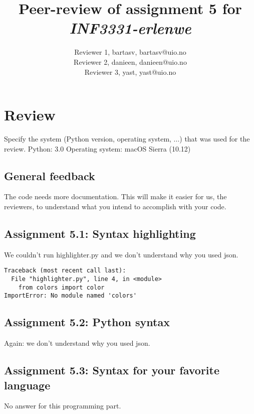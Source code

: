 \documentclass[a4paper]{article}
\title{Peer-review of assignment 5 for \textit{INF3331-erlenwe}}
\author{Reviewer 1, bartasv, {bartasv@uio.no} \\
 		Reviewer 2, danieen, {danieen@uio.no} \\
		Reviewer 3, yast, {yast@uio.no}}
\begin{document}
\maketitle

\section{Review}\label{sec:review}

Specify the system (Python version, operating system, ...) that was used for the review. \newline
Python: 3.0				Operating system: macOS Sierra (10.12)
\subsection*{General feedback}
The code needs more documentation. This will make it easier for us, the reviewers, to understand what you intend to accomplish with your code.

\subsection*{Assignment 5.1: Syntax highlighting}
We couldn't run highlighter.py and we don't understand why you used json.

\begin{verbatim}
Traceback (most recent call last):
  File "highlighter.py", line 4, in <module>
    from colors import color
ImportError: No module named 'colors'
\end{verbatim}

\subsection*{Assignment 5.2: Python syntax} \label{sec:assignment5.2}
Again: we don't understand why you used json.

\subsection*{Assignment 5.3: Syntax for your favorite language}
No answer for this programming part.

\end{document}
